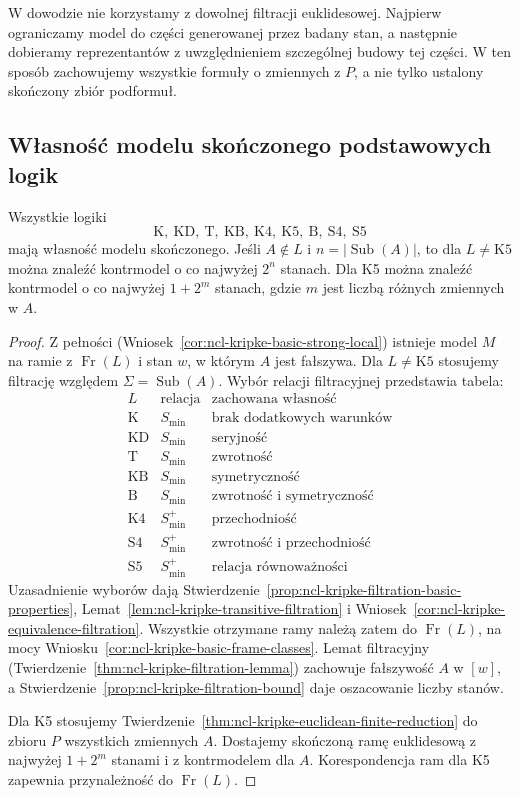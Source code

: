 W dowodzie nie korzystamy z dowolnej
filtracji euklidesowej. Najpierw ograniczamy
model do części generowanej przez badany
stan, a następnie dobieramy reprezentantów
z uwzględnieniem szczególnej budowy tej części.
W ten sposób zachowujemy wszystkie formuły
o zmiennych z $P$, a nie tylko ustalony
skończony zbiór podformuł.

\subsection{Własność modelu skończonego podstawowych logik}

\begin{twierdzenie}
\label{thm:ncl-kripke-basic-fmp}
Wszystkie logiki
\[
 \mathrm K,\ \mathrm{KD},\ \mathrm T,\ \mathrm{KB},\
 \mathrm{K4},\ \mathrm{K5},\ \mathrm B,\
 \mathrm{S4},\ \mathrm{S5}
\]
mają własność modelu skończonego.
Jeśli $A\notin L$ i
$n=|\operatorname{Sub}(A)|$, to dla
$L\ne\mathrm{K5}$ można znaleźć kontrmodel
o co najwyżej $2^n$ stanach.
Dla K5 można znaleźć kontrmodel
o co najwyżej $1+2^m$ stanach, gdzie $m$
jest liczbą różnych zmiennych w $A$.
\end{twierdzenie}
\begin{proof}
Z pełności
(Wniosek~\ref{cor:ncl-kripke-basic-strong-local})
istnieje model $M$ na ramie z
$\operatorname{Fr}(L)$ i stan $w$,
w którym $A$ jest fałszywa.
Dla $L\ne\mathrm{K5}$ stosujemy filtrację
względem $\Sigma=\operatorname{Sub}(A)$.
Wybór relacji filtracyjnej przedstawia tabela:
\[
\begin{array}{c|c|l}
 L &\text{relacja}&\text{zachowana własność}\\ \hline
 \mathrm K&S_{\min}&\text{brak dodatkowych warunków}\\
 \mathrm{KD}&S_{\min}&\text{seryjność}\\
 \mathrm T&S_{\min}&\text{zwrotność}\\
 \mathrm{KB}&S_{\min}&\text{symetryczność}\\
 \mathrm B&S_{\min}&\text{zwrotność i symetryczność}\\
 \mathrm{K4}&S_{\min}^{+}&\text{przechodniość}\\
 \mathrm{S4}&S_{\min}^{+}&\text{zwrotność i przechodniość}\\
 \mathrm{S5}&S_{\min}^{+}&\text{relacja równoważności}
\end{array}
\]
Uzasadnienie wyborów dają
Stwierdzenie~\ref{prop:ncl-kripke-filtration-basic-properties},
Lemat~\ref{lem:ncl-kripke-transitive-filtration}
i Wniosek~\ref{cor:ncl-kripke-equivalence-filtration}.
Wszystkie otrzymane ramy należą zatem
do $\operatorname{Fr}(L)$, na mocy
Wniosku~\ref{cor:ncl-kripke-basic-frame-classes}.
Lemat filtracyjny
(Twierdzenie~\ref{thm:ncl-kripke-filtration-lemma})
zachowuje fałszywość $A$ w $[w]$, a
Stwierdzenie~\ref{prop:ncl-kripke-filtration-bound}
daje oszacowanie liczby stanów.

Dla K5 stosujemy
Twierdzenie~\ref{thm:ncl-kripke-euclidean-finite-reduction}
do zbioru $P$ wszystkich zmiennych $A$.
Dostajemy skończoną ramę euklidesową
z najwyżej $1+2^m$ stanami i z kontrmodelem
dla $A$. Korespondencja ram dla K5
zapewnia przynależność do $\operatorname{Fr}(L)$.
\end{proof}

